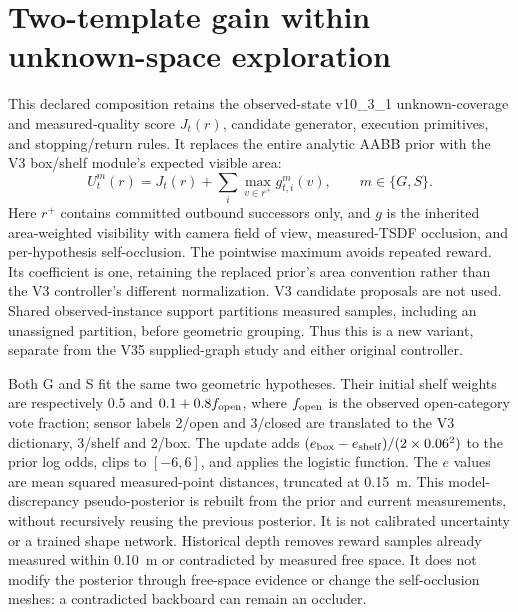 \clearpage
\section{Two-template gain within unknown-space exploration}
\label{sec:dual-template-unknown}

This declared composition retains the observed-state v10\_3\_1 unknown-coverage and measured-quality score $J_t(r)$, candidate generator, execution primitives, and stopping/return rules. It replaces the entire analytic AABB prior with the V3 box/shelf module's expected visible area:
\begin{equation}
U_t^m(r)=J_t(r)+\sum_i\max_{v\in r^+} g_{t,i}^m(v),\qquad m\in\{G,S\}.
\end{equation}
Here $r^+$ contains committed outbound successors only, and $g$ is the inherited area-weighted visibility with camera field of view, measured-TSDF occlusion, and per-hypothesis self-occlusion. The pointwise maximum avoids repeated reward. Its coefficient is one, retaining the replaced prior's area convention rather than the V3 controller's different normalization. V3 candidate proposals are not used. Shared observed-instance support partitions measured samples, including an unassigned partition, before geometric grouping. Thus this is a new variant, separate from the V35 supplied-graph study and either original controller.

Both G and S fit the same two geometric hypotheses. Their initial shelf weights are respectively $0.5$ and $0.1+0.8f_{\rm open}$, where $f_{\rm open}$ is the observed open-category vote fraction; sensor labels 2/open and 3/closed are translated to the V3 dictionary, 3/shelf and 2/box. The update adds $(e_{\rm box}-e_{\rm shelf})/(2\times0.06^2)$ to the prior log odds, clips to $[-6,6]$, and applies the logistic function. The $e$ values are mean squared measured-point distances, truncated at 0.15~m. This model-discrepancy pseudo-posterior is rebuilt from the prior and current measurements, without recursively reusing the previous posterior. It is not calibrated uncertainty or a trained shape network. Historical depth removes reward samples already measured within 0.10~m or contradicted by measured free space. It does not modify the posterior through free-space evidence or change the self-occlusion meshes: a contradicted backboard can remain an occluder.


